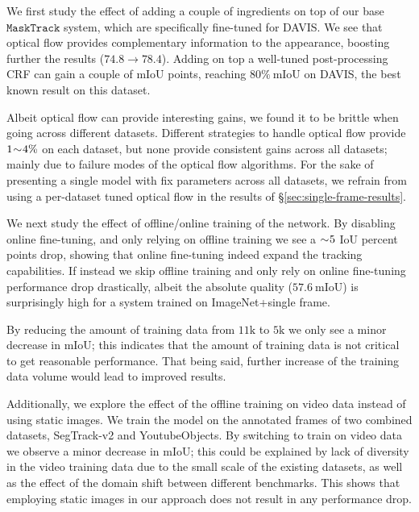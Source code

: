 \documentclass[10pt,twocolumn,letterpaper]{article}
\makeatletter
\renewcommand{\paragraph}{\@startsection{paragraph}{4}{\z@}{0.5ex \@plus 1ex \@minus .2ex}{-0.5em}{\normalfont \normalsize \bfseries}}
\newcommand{\segtrack}{SegTrack-v2}
\makeatother
\begin{document}
\paragraph{Add-ons}
We first study the effect of adding a couple of ingredients on top of our base $\mathtt{MaskTrack}$ system, which are specifically fine-tuned for DAVIS.
We see that optical flow provides complementary information to the appearance, boosting further the results ($74.8 \rightarrow 78.4$). Adding on top a well-tuned post-processing CRF \cite{Kraehenbuehl2011Nips}
can gain a couple of mIoU points, reaching $80\%\ \text{mIoU}$ on DAVIS, the best known result on this dataset.

Albeit optical flow can provide interesting gains, we found it to be brittle when going across different datasets. Different strategies to handle optical flow provide $1\negmedspace\sim\negmedspace4 \%$
on each dataset,
but none provide consistent gains across all datasets; mainly due to failure modes of the optical flow algorithms. For the sake of presenting a single model with fix parameters across all datasets, we refrain from using
a per-dataset tuned optical flow in the results of \S\ref{sec:single-frame-results}.

\paragraph{Training}
We next study the effect of offline/online training of the network.
By disabling online fine-tuning, and only relying on offline training we see a $\sim\negmedspace5$ IoU percent points drop, showing that online fine-tuning indeed expand the tracking capabilities.
If instead we skip offline training and only rely on online fine-tuning performance drop drastically, albeit the absolute quality ($57.6\ \text{mIoU}$) is surprisingly high for a system trained on ImageNet+single frame.

By reducing the amount of training data from $11\text{k}$ to $5\text{k}$ we only see a minor decrease in mIoU; this indicates that the amount of training data is not critical to get reasonable performance.
That being said, further increase of the training data volume would lead to improved results.


Additionally, we explore the effect of the offline training on video data instead of using static images. We train the model on the annotated frames of two combined datasets, \segtrack{} and YoutubeObjects.
By switching to train on video data we observe a minor decrease in mIoU; this could be explained by lack of diversity in the video training data due to the small scale of the existing datasets,
as well as the effect of the domain shift between different benchmarks. This shows that employing static images in our approach does not result in any performance drop.
\end{document}
